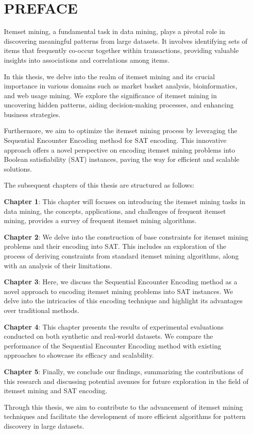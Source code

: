 \chapter*{PREFACE}
\fontsize{13}{15}\selectfont

Itemset mining, a fundamental task in data mining, plays a pivotal role in discovering meaningful patterns from large datasets. It involves identifying sets of items that frequently co-occur together within transactions, providing valuable insights into associations and correlations among items.

In this thesis, we delve into the realm of itemset mining and its crucial importance in various domains such as market basket analysis, bioinformatics, and web usage mining. We explore the significance of itemset mining in uncovering hidden patterns, aiding decision-making processes, and enhancing business strategies.

Furthermore, we aim to optimize the itemset mining process by leveraging the Sequential Encounter Encoding method for SAT encoding. This innovative approach offers a novel perspective on encoding itemset mining problems into Boolean satisfiability (SAT) instances, paving the way for efficient and scalable solutions.

The subsequent chapters of this thesis are structured as follows:

\textbf{Chapter 1}: This chapter will focuses on introducing the itemset mining tasks in data mining, the concepts, applications, and challenges of frequent itemset mining, provides a survey of frequent itemset mining algorithms.

\textbf{Chapter 2}: We delve into the construction of base constraints for itemset mining problems and their encoding into SAT. This includes an exploration of the process of deriving constraints from standard itemset mining algorithms, along with an analysis of their limitations.

\textbf{Chapter 3}: Here, we discuss the Sequential Encounter Encoding method as a novel approach to encoding itemset mining problems into SAT instances. We delve into the intricacies of this encoding technique and highlight its advantages over traditional methods.

\textbf{Chapter 4}: This chapter presents the results of experimental evaluations conducted on both synthetic and real-world datasets. We compare the performance of the Sequential Encounter Encoding method with existing approaches to showcase its efficacy and scalability.

\textbf{Chapter 5}: Finally, we conclude our findings, summarizing the contributions of this research and discussing potential avenues for future exploration in the field of itemset mining and SAT encoding.

Through this thesis, we aim to contribute to the advancement of itemset mining techniques and facilitate the development of more efficient algorithms for pattern discovery in large datasets.